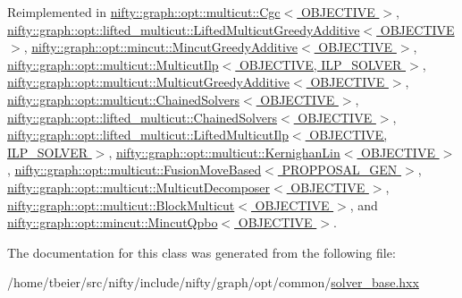 Reimplemented in \hyperlink{classnifty_1_1graph_1_1opt_1_1multicut_1_1Cgc_aff65d0bc2f7537bf328c47979a3293d5}{nifty\+::graph\+::opt\+::multicut\+::\+Cgc$<$ O\+B\+J\+E\+C\+T\+I\+V\+E $>$}, \hyperlink{classnifty_1_1graph_1_1opt_1_1lifted__multicut_1_1LiftedMulticutGreedyAdditive_a13ed6cbca21df0bb7fc22d298533e4a7}{nifty\+::graph\+::opt\+::lifted\+\_\+multicut\+::\+Lifted\+Multicut\+Greedy\+Additive$<$ O\+B\+J\+E\+C\+T\+I\+V\+E $>$}, \hyperlink{classnifty_1_1graph_1_1opt_1_1mincut_1_1MincutGreedyAdditive_aa7b71928fc3f6e46f5ec99c0119c5787}{nifty\+::graph\+::opt\+::mincut\+::\+Mincut\+Greedy\+Additive$<$ O\+B\+J\+E\+C\+T\+I\+V\+E $>$}, \hyperlink{classnifty_1_1graph_1_1opt_1_1multicut_1_1MulticutIlp_a532d846fdb2feecb240373e87fec82a4}{nifty\+::graph\+::opt\+::multicut\+::\+Multicut\+Ilp$<$ O\+B\+J\+E\+C\+T\+I\+V\+E, I\+L\+P\+\_\+\+S\+O\+L\+V\+E\+R $>$}, \hyperlink{classnifty_1_1graph_1_1opt_1_1multicut_1_1MulticutGreedyAdditive_a1d9cf81f32600a8f52ff4e1607203716}{nifty\+::graph\+::opt\+::multicut\+::\+Multicut\+Greedy\+Additive$<$ O\+B\+J\+E\+C\+T\+I\+V\+E $>$}, \hyperlink{classnifty_1_1graph_1_1opt_1_1multicut_1_1ChainedSolvers_ac87503e00006560417c7ab7af4685383}{nifty\+::graph\+::opt\+::multicut\+::\+Chained\+Solvers$<$ O\+B\+J\+E\+C\+T\+I\+V\+E $>$}, \hyperlink{classnifty_1_1graph_1_1opt_1_1lifted__multicut_1_1ChainedSolvers_a68158bd1f3cf0198769e52635989b9b6}{nifty\+::graph\+::opt\+::lifted\+\_\+multicut\+::\+Chained\+Solvers$<$ O\+B\+J\+E\+C\+T\+I\+V\+E $>$}, \hyperlink{classnifty_1_1graph_1_1opt_1_1lifted__multicut_1_1LiftedMulticutIlp_a3d487db0bd9410f25dd800d04a6633e8}{nifty\+::graph\+::opt\+::lifted\+\_\+multicut\+::\+Lifted\+Multicut\+Ilp$<$ O\+B\+J\+E\+C\+T\+I\+V\+E, I\+L\+P\+\_\+\+S\+O\+L\+V\+E\+R $>$}, \hyperlink{classnifty_1_1graph_1_1opt_1_1multicut_1_1KernighanLin_ab1238ad81c57f105502a940986e9ffaf}{nifty\+::graph\+::opt\+::multicut\+::\+Kernighan\+Lin$<$ O\+B\+J\+E\+C\+T\+I\+V\+E $>$}, \hyperlink{classnifty_1_1graph_1_1opt_1_1multicut_1_1FusionMoveBased_acf62cb1de04c57534601efaff463af0f}{nifty\+::graph\+::opt\+::multicut\+::\+Fusion\+Move\+Based$<$ P\+R\+O\+P\+P\+O\+S\+A\+L\+\_\+\+G\+E\+N $>$}, \hyperlink{classnifty_1_1graph_1_1opt_1_1multicut_1_1MulticutDecomposer_a084c96012a6e513417b08f9e4242f6f7}{nifty\+::graph\+::opt\+::multicut\+::\+Multicut\+Decomposer$<$ O\+B\+J\+E\+C\+T\+I\+V\+E $>$}, \hyperlink{classnifty_1_1graph_1_1opt_1_1multicut_1_1BlockMulticut_a7646a6b7c8fe3b8e40ab6f72ab952081}{nifty\+::graph\+::opt\+::multicut\+::\+Block\+Multicut$<$ O\+B\+J\+E\+C\+T\+I\+V\+E $>$}, and \hyperlink{classnifty_1_1graph_1_1opt_1_1mincut_1_1MincutQpbo_acab46ec306e4b604eff21549a4366d39}{nifty\+::graph\+::opt\+::mincut\+::\+Mincut\+Qpbo$<$ O\+B\+J\+E\+C\+T\+I\+V\+E $>$}.



The documentation for this class was generated from the following file\+:\begin{DoxyCompactItemize}
\item 
/home/tbeier/src/nifty/include/nifty/graph/opt/common/\hyperlink{solver__base_8hxx}{solver\+\_\+base.\+hxx}\end{DoxyCompactItemize}
